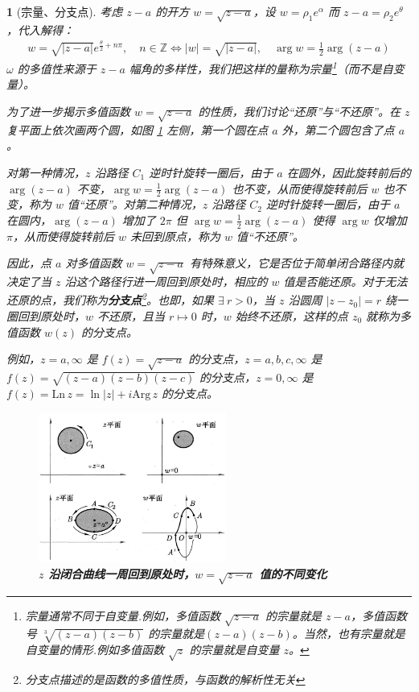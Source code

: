 \documentclass[UTF8]{report}
\def\Arg{\mathrm{Arg}\,}
\def\Ln{\mathrm{Ln\,}}
\def\Z{\mathbb{Z}}
\theoremstyle{MyLineTheoremStyle} %
\theoremstyle{MyBlockTheoremStyle} %
\theoremstyle{MySubsubsectionStyle} %
\newtheorem{definition}{}
\begin{document}
\begin{definition}[宗量、分支点]
考虑 $z-a$ 的开方 $w =\sqrt{z-a}$，设 $w = \rho_1 e^{\alpha}$ 而 $z-a = \rho_2e^{\theta}$，代入解得：
\begin{gather}
     w = \sqrt{| z-a |} e^{\frac{\theta}{2} + n\pi}, \quad n \in \Z \Longleftrightarrow 
     | w | = \sqrt{| z-a |},\quad \arg w = \frac{1}{2} \arg (z-a)
\end{gather}
$\omega $ 的多值性来源于 $z-a$ 幅角的多样性，我们把这样的量称为宗量\footnote{宗量通常不同于自变量.例如，多值函数 $\sqrt{z-a}$ 的宗量就是 $z-a$，多值函数号 $\sqrt[3]{(z - a)(z - b)}$ 的宗量就是$(z-a)(z-b)$。当然，也有宗量就是自变量的情形.例如多值函数 $\sqrt{z}$ 的宗量就是自变量 $z$。}（而不是自变量）。

为了进一步揭示多值函数 $w = \sqrt{z-a}$ 的性质，我们讨论“还原”与“不还原”。在 $z$ 复平面上依次画两个圆，如图 \ref{沿闭合曲线一周回到原处时} 左侧，第一个圆在点 $a$ 外，第二个圆包含了点 $a$。

对第一种情况，$z$ 沿路径 $C_1$ 逆时针旋转一圈后，由于 $a$ 在圆外，因此旋转前后的 $\arg (z-a)$ 不变，$\arg w = \frac{1}{2} \arg (z-a)$ 也不变，从而使得旋转前后 $w$ 也不变，称为 $w$ 值“还原”。对第二种情况，$z$ 沿路径 $C_2$ 逆时针旋转一圈后，由于 $a$ 在圆内，$\arg (z-a)$ 增加了 $2\pi$ 但 $\arg w = \frac{1}{2} \arg (z-a)$ 使得 $\arg w$ 仅增加 $\pi$，从而使得旋转前后 $w$ 未回到原点，称为 $w$ 值“不还原”。

因此，点 $a$ 对多值函数 $w =\sqrt{z-a}$ 有特殊意义，它是否位于简单闭合路径内就决定了当 $z$ 沿这个路径行进一周回到原处时，相应的 $w$ 值是否能还原。对于无法还原的点，我们称为\textbf{分支点}\footnote{分支点描述的是函数的多值性质，与函数的解析性无关}。也即，如果 $\exists\ r >0$，当 $z$ 沿圆周 $| z - z_0 | = r$ 绕一圈回到原处时，$w$ 不还原，且当 $r \mapsto 0$ 时，$w$ 始终不还原，这样的点 $z_0$ 就称为多值函数 $w(z)$ 的分支点。
{\par\color{gray}\small
例如，$z = a, \infty $ 是 $ f(z) = \sqrt{z - a} $ 的分支点，$z = a,b,c, \infty$ 是 $f(z) = \sqrt{(z-a)(z-b)(z-c)} $ 的分支点，$z = 0, \infty$ 是 $ f(z) = \Ln z = \ln | z | + i\Arg z$ 的分支点。
\par}
 


\begin{figure}[H]\centering
\includegraphics[width=0.55\textwidth]{assets/1,2/image (43).jpg}
\caption{\textbf{$z$ 沿闭合曲线一周回到原处时，$w = \sqrt{z-a}$ 值的不同变化}}\label{沿闭合曲线一周回到原处时}
\end{figure}
\end{definition}
\end{document}
